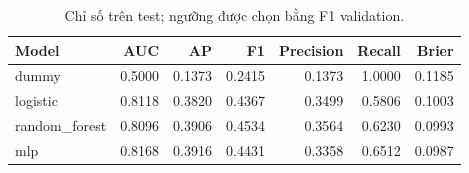 \begin{table}[H]\centering\small
\caption{Chỉ số trên test; ngưỡng được chọn bằng F1 validation.}
\begin{tabular}{@{}lrrrrrr@{}}\toprule
Model & AUC & AP & F1 & Precision & Recall & Brier \\\midrule
dummy & 0.5000 & 0.1373 & 0.2415 & 0.1373 & 1.0000 & 0.1185 \\
logistic & 0.8118 & 0.3820 & 0.4367 & 0.3499 & 0.5806 & 0.1003 \\
random\_forest & 0.8096 & 0.3906 & 0.4534 & 0.3564 & 0.6230 & 0.0993 \\
mlp & 0.8168 & 0.3916 & 0.4431 & 0.3358 & 0.6512 & 0.0987 \\
\bottomrule\end{tabular}
\end{table}